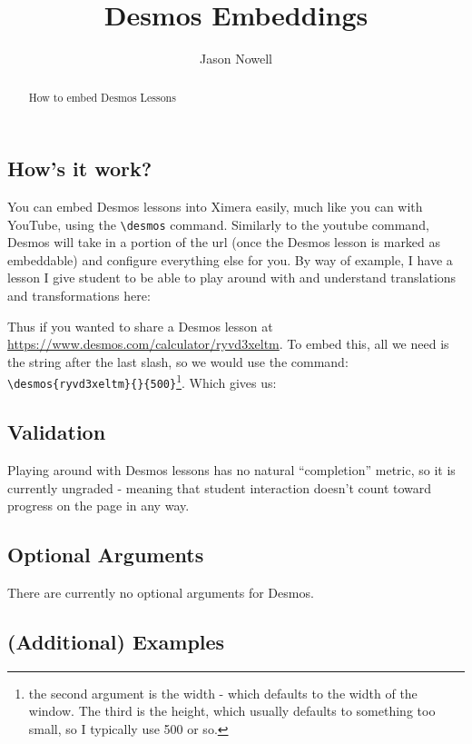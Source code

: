 \documentclass{ximera}
\title{Desmos Embeddings}
\author{Jason Nowell}
\begin{document}
\begin{abstract}
    How to embed Desmos Lessons
\end{abstract}
\maketitle

    \subsection*{How's it work?}
    
        You can embed Desmos lessons into Ximera easily, much like you can with YouTube, using the \verb|\desmos| command. Similarly to the youtube command, Desmos will take in a portion of the url (once the Desmos lesson is marked as embeddable) and configure everything else for you. By way of example, I have a lesson I give student to be able to play around with and understand translations and transformations here: 
        
        Thus if you wanted to share a Desmos lesson at \url{https://www.desmos.com/calculator/ryvd3xeltm}. To embed this, all we need is the string after the last slash, so we would use the command: \\ \verb|\desmos{ryvd3xeltm}{}{500}|\footnote{the second argument is the width - which defaults to the width of the window. The third is the height, which usually defaults to something too small, so I typically use 500 or so.}. Which gives us:
    
    
    \subsection*{Validation}
        Playing around with Desmos lessons has no natural ``completion'' metric, so it is currently ungraded - meaning that student interaction doesn't count toward progress on the page in any way.
    
        
    \subsection*{Optional Arguments}
        There are currently no optional arguments for Desmos.
    
    \subsection*{(Additional) Examples}
    
\end{document}
